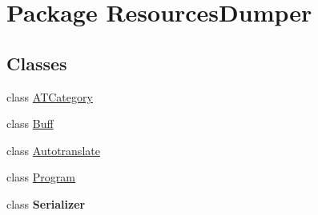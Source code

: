 \hypertarget{namespace_resources_dumper}{\section{Package Resources\-Dumper}
\label{namespace_resources_dumper}
}
\subsection*{Classes}
\begin{DoxyCompactItemize}
\item 
class \hyperlink{class_resources_dumper_1_1_a_t_category}{A\-T\-Category}
\item 
class \hyperlink{class_resources_dumper_1_1_buff}{Buff}
\item 
class \hyperlink{class_resources_dumper_1_1_autotranslate}{Autotranslate}
\item 
class \hyperlink{class_resources_dumper_1_1_program}{Program}
\item 
class {\bfseries Serializer}
\end{DoxyCompactItemize}
